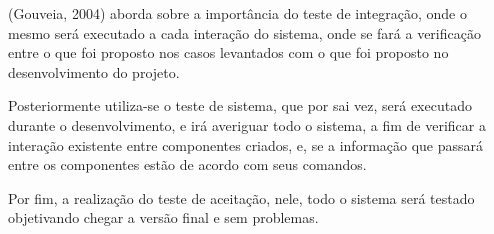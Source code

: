 (Gouveia, 2004) aborda sobre a importância do teste de integração, onde o mesmo será executado a cada interação do sistema, onde se fará a verificação entre o que foi proposto nos casos levantados com o que foi proposto no desenvolvimento do projeto.

Posteriormente utiliza-se o teste de sistema, que por sai vez, será executado durante o desenvolvimento, e irá averiguar todo o sistema, a fim de verificar a interação existente entre componentes criados, e, se a informação que passará entre os componentes estão de acordo com seus comandos.

Por fim, a realização do teste de aceitação, nele, todo o sistema será testado objetivando chegar a versão final e sem problemas.












